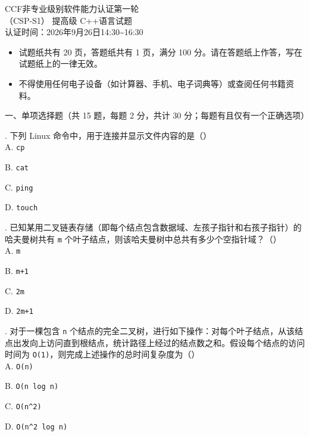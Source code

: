 \documentclass[a4paper]{ctexart}
\newcommand{\wdot}{{\wingdingsfont\fontsize{12}{12}\selectfont\XeTeXglyph122\relax}}
\newcommand{\bigtitle}[1]{\noindent\heiti #1\par\vspace{2pt}}
\newcommand{\q}[1]{\noindent #1}
\newcommand{\opt}[1]{\hspace*{2em} #1\par}
\begin{document}
\begin{center}
{\dengxian
    {\fontsize{15.95}{1} CCF非专业级别软件能力认证第一轮} \\[1.5em]
    {\fontsize{15.95}{1}\selectfont （CSP-S1） 提高级 C++\hspace{0pt}语言试题} \\[1.5em]
    {\fontsize{14.05}{1}\selectfont 认证时间：2026年9月26日14:30\textasciitilde16:30}
}
\end{center}

\vspace{8pt}
\begin{itemize}[leftmargin=2.6em, itemsep=1pt, label={}]
    \item \wdot\hspace{0.5em}试题纸共有 20 页，答题纸共有 1 页，满分 100 分。请在答题纸上作答，写在试题纸上的一律无效。
    \item \wdot\hspace{0.5em}不得使用任何电子设备（如计算器、手机、电子词典等）或查阅任何书籍资料。
\end{itemize}

\bigtitle{一、单项选择题（共 15 题，每题 2 分，共计 30 分；每题有且仅有一个正确选项）}

\q{1.} 下列 Linux 命令中，用于连接并显示文件内容的是（\qquad）\\
\opt{A. \texttt{cp}}
\opt{B. \texttt{cat}}
\opt{C. \texttt{ping}}
\opt{D. \texttt{touch}}

\q{2.} 已知某用二叉链表存储（即每个结点包含数据域、左孩子指针和右孩子指针）的哈夫曼树共有 \texttt{m} 个叶子结点，则该哈夫曼树中总共有多少个空指针域？（\qquad）\\
\opt{A. \texttt{m}}
\opt{B. \texttt{m+1}}
\opt{C. \texttt{2m}}
\opt{D. \texttt{2m+1}}

\q{3.} 对于一棵包含 \texttt{n} 个结点的完全二叉树，进行如下操作：对每个叶子结点，从该结点出发向上访问直到根结点，统计路径上经过的结点数之和。假设每个结点的访问时间为 \texttt{O(1)}，则完成上述操作的总时间复杂度为（\qquad）\\
\opt{A. \texttt{O(n)}}
\opt{B. \texttt{O(n log n)}}
\opt{C. \texttt{O(n\^{}2)}}
\opt{D. \texttt{O(n\^{}2 log n)}}
\end{document}
